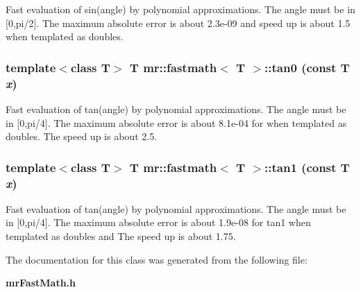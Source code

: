 Fast evaluation of sin(angle) by polynomial approximations. The angle must be in [0,pi/2]. The maximum absolute error is about 2.3e-09 and speed up is about 1.5 when templated as doubles. 
\subsubsection{\setlength{\rightskip}{0pt plus 5cm}template$<$class T$>$ T {\bf mr::fastmath}$<$ T $>$::tan0 (const T {\em x})\hspace{0.3cm}{\tt  [inline, static]}}\label{classmr_1_1fastmath_e4}


Fast evaluation of tan(angle) by polynomial approximations. The angle must be in [0,pi/4]. The maximum absolute error is about 8.1e-04 for when templated as doubles. The speed up is about 2.5. 
\subsubsection{\setlength{\rightskip}{0pt plus 5cm}template$<$class T$>$ T {\bf mr::fastmath}$<$ T $>$::tan1 (const T {\em x})\hspace{0.3cm}{\tt  [inline, static]}}\label{classmr_1_1fastmath_e5}


Fast evaluation of tan(angle) by polynomial approximations. The angle must be in [0,pi/4]. The maximum absolute error is about 1.9e-08 for tan1 when templated as doubles and The speed up is about 1.75. 

The documentation for this class was generated from the following file:\begin{CompactItemize}
\item 
{\bf mr\-Fast\-Math.h}\end{CompactItemize}
